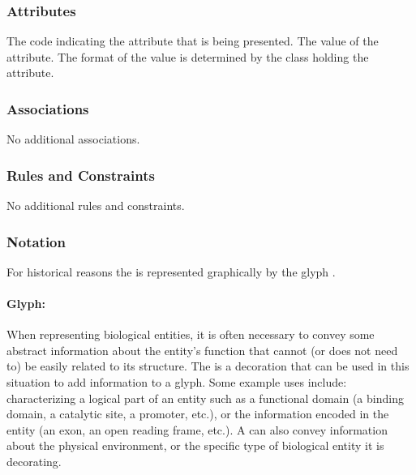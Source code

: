 \subsubsection{Attributes}

\begin{attributes}
   The code indicating the attribute that is
  being presented.
   The value of the attribute. The format of
  the value is determined by the class holding the attribute.
\end{attributes}

\subsubsection{Associations}

No additional associations.

\subsubsection{Rules and Constraints}

No additional rules and constraints.

\subsubsection{Notation}

For historical reasons the  is represented
graphically by the glyph .

\paragraph{Glyph: }
\label{sec:unitInfo}

When representing biological entities, it is often necessary to convey
some abstract information about the entity's function that cannot (or
does not need to) be easily related to its structure.  The  is a decoration that can be used in this situation
to add information to a glyph.  Some example uses include:
characterizing a logical part of an entity such as a functional domain
(a binding domain, a catalytic site, a promoter, etc.), or the
information encoded in the entity (an exon, an open reading frame,
etc.).  A  can also convey information
about the physical environment, or the specific type of biological
entity it is decorating.

